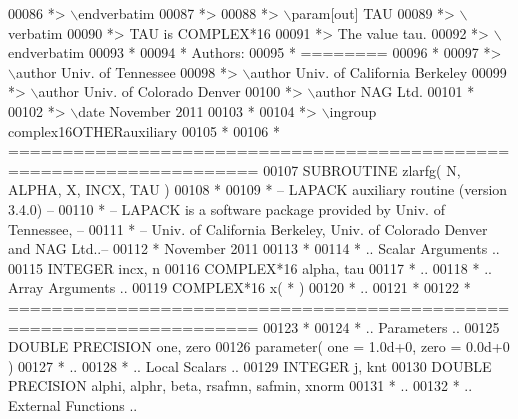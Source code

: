 \begin{DoxyCode}
00086 \textcolor{comment}{*> \(\backslash\)endverbatim}
00087 \textcolor{comment}{*>}
00088 \textcolor{comment}{*> \(\backslash\)param[out] TAU}
00089 \textcolor{comment}{*> \(\backslash\)verbatim}
00090 \textcolor{comment}{*>          TAU is COMPLEX*16}
00091 \textcolor{comment}{*>          The value tau.}
00092 \textcolor{comment}{*> \(\backslash\)endverbatim}
00093 \textcolor{comment}{*}
00094 \textcolor{comment}{*  Authors:}
00095 \textcolor{comment}{*  ========}
00096 \textcolor{comment}{*}
00097 \textcolor{comment}{*> \(\backslash\)author Univ. of Tennessee }
00098 \textcolor{comment}{*> \(\backslash\)author Univ. of California Berkeley }
00099 \textcolor{comment}{*> \(\backslash\)author Univ. of Colorado Denver }
00100 \textcolor{comment}{*> \(\backslash\)author NAG Ltd. }
00101 \textcolor{comment}{*}
00102 \textcolor{comment}{*> \(\backslash\)date November 2011}
00103 \textcolor{comment}{*}
00104 \textcolor{comment}{*> \(\backslash\)ingroup complex16OTHERauxiliary}
00105 \textcolor{comment}{*}
00106 \textcolor{comment}{*  =====================================================================}
00107 \textcolor{keyword}{      SUBROUTINE }zlarfg( N, ALPHA, X, INCX, TAU )
00108 \textcolor{comment}{*}
00109 \textcolor{comment}{*  -- LAPACK auxiliary routine (version 3.4.0) --}
00110 \textcolor{comment}{*  -- LAPACK is a software package provided by Univ. of Tennessee,    --}
00111 \textcolor{comment}{*  -- Univ. of California Berkeley, Univ. of Colorado Denver and NAG Ltd..--}
00112 \textcolor{comment}{*     November 2011}
00113 \textcolor{comment}{*}
00114 \textcolor{comment}{*     .. Scalar Arguments ..}
00115       \textcolor{keywordtype}{INTEGER}            incx, n
00116       \textcolor{keywordtype}{COMPLEX*16}         alpha, tau
00117 \textcolor{comment}{*     ..}
00118 \textcolor{comment}{*     .. Array Arguments ..}
00119       \textcolor{keywordtype}{COMPLEX*16}         x( * )
00120 \textcolor{comment}{*     ..}
00121 \textcolor{comment}{*}
00122 \textcolor{comment}{*  =====================================================================}
00123 \textcolor{comment}{*}
00124 \textcolor{comment}{*     .. Parameters ..}
00125       \textcolor{keywordtype}{DOUBLE PRECISION}   one, zero
00126       parameter( one = 1.0d+0, zero = 0.0d+0 )
00127 \textcolor{comment}{*     ..}
00128 \textcolor{comment}{*     .. Local Scalars ..}
00129       \textcolor{keywordtype}{INTEGER}            j, knt
00130       \textcolor{keywordtype}{DOUBLE PRECISION}   alphi, alphr, beta, rsafmn, safmin, xnorm
00131 \textcolor{comment}{*     ..}
00132 \textcolor{comment}{*     .. External Functions ..}

\end{DoxyCode}
